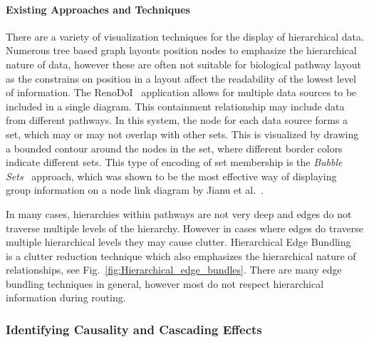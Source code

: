 \documentclass[twocolumn]{bmcart}%
\begin{document}
%
\paragraph*{Existing Approaches and Techniques}

There are a variety of visualization techniques for the display of hierarchical data.
Numerous tree based graph layouts position nodes to emphasize the hierarchical nature of data, however these are often not suitable for biological pathway layout as the constrains on position in a layout affect the readability of the lowest level of information.
The RenoDoI~\cite{Vehlow2015} application allows for multiple data sources to be included in a single diagram.
This containment relationship may include data from different pathways.
In this system, the node for each data source forms a set, which may or may not overlap with other sets.
This is visualized by drawing a bounded contour around the nodes in the set, where different border colors indicate different sets.
This type of encoding of set membership is the \textit{Bubble Sets}~\cite{Collins2009} approach, which was shown to be the most effective way of displaying group information on a node link diagram by Jianu et al.~\cite{Jianu2014}.


In many cases, hierarchies within pathways are not very deep and edges do not traverse multiple levels of the hierarchy.
However in cases where edges do traverse multiple hierarchical levels they may cause clutter.
Hierarchical Edge Bundling~\cite{Holten2006} is a clutter reduction technique which also emphasizes the hierarchical nature of relationships, see Fig.~\ref{fig:Hierarchical_edge_bundles}.
There are many edge bundling techniques in general, however most do not respect hierarchical information during routing.

\subsubsection*{Identifying Causality and Cascading Effects}
\end{document}
